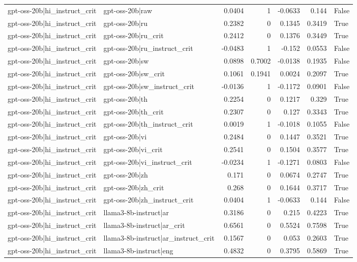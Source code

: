 \begin{table}
\begin{tabular}{l l r r r r l}
gpt-oss-20b|hi_instruct_crit & gpt-oss-20b|raw & 0.0404 & 1 & -0.0633 & 0.144 & False \\
gpt-oss-20b|hi_instruct_crit & gpt-oss-20b|ru & 0.2382 & 0 & 0.1345 & 0.3419 & True \\
gpt-oss-20b|hi_instruct_crit & gpt-oss-20b|ru_crit & 0.2412 & 0 & 0.1376 & 0.3449 & True \\
gpt-oss-20b|hi_instruct_crit & gpt-oss-20b|ru_instruct_crit & -0.0483 & 1 & -0.152 & 0.0553 & False \\
gpt-oss-20b|hi_instruct_crit & gpt-oss-20b|sw & 0.0898 & 0.7002 & -0.0138 & 0.1935 & False \\
gpt-oss-20b|hi_instruct_crit & gpt-oss-20b|sw_crit & 0.1061 & 0.1941 & 0.0024 & 0.2097 & True \\
gpt-oss-20b|hi_instruct_crit & gpt-oss-20b|sw_instruct_crit & -0.0136 & 1 & -0.1172 & 0.0901 & False \\
gpt-oss-20b|hi_instruct_crit & gpt-oss-20b|th & 0.2254 & 0 & 0.1217 & 0.329 & True \\
gpt-oss-20b|hi_instruct_crit & gpt-oss-20b|th_crit & 0.2307 & 0 & 0.127 & 0.3343 & True \\
gpt-oss-20b|hi_instruct_crit & gpt-oss-20b|th_instruct_crit & 0.0019 & 1 & -0.1018 & 0.1055 & False \\
gpt-oss-20b|hi_instruct_crit & gpt-oss-20b|vi & 0.2484 & 0 & 0.1447 & 0.3521 & True \\
gpt-oss-20b|hi_instruct_crit & gpt-oss-20b|vi_crit & 0.2541 & 0 & 0.1504 & 0.3577 & True \\
gpt-oss-20b|hi_instruct_crit & gpt-oss-20b|vi_instruct_crit & -0.0234 & 1 & -0.1271 & 0.0803 & False \\
gpt-oss-20b|hi_instruct_crit & gpt-oss-20b|zh & 0.171 & 0 & 0.0674 & 0.2747 & True \\
gpt-oss-20b|hi_instruct_crit & gpt-oss-20b|zh_crit & 0.268 & 0 & 0.1644 & 0.3717 & True \\
gpt-oss-20b|hi_instruct_crit & gpt-oss-20b|zh_instruct_crit & 0.0404 & 1 & -0.0633 & 0.144 & False \\
gpt-oss-20b|hi_instruct_crit & llama3-8b-instruct|ar & 0.3186 & 0 & 0.215 & 0.4223 & True \\
gpt-oss-20b|hi_instruct_crit & llama3-8b-instruct|ar_crit & 0.6561 & 0 & 0.5524 & 0.7598 & True \\
gpt-oss-20b|hi_instruct_crit & llama3-8b-instruct|ar_instruct_crit & 0.1567 & 0 & 0.053 & 0.2603 & True \\
gpt-oss-20b|hi_instruct_crit & llama3-8b-instruct|eng & 0.4832 & 0 & 0.3795 & 0.5869 & True \\

\end{tabular}
\end{table}
